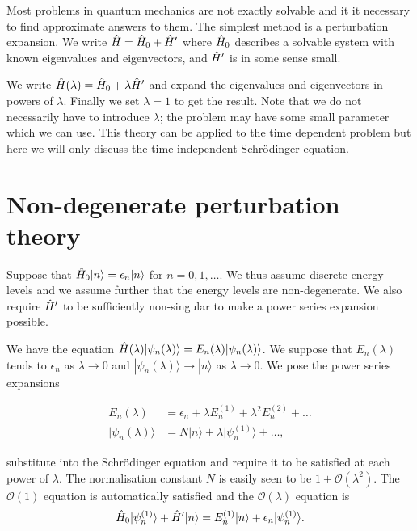 \documentclass{notes}
\newcommand{\cO}{\mathcal{O}}
\newcommand{\ket}[1]{|#1\rangle}
\begin{document}
Most problems in quantum mechanics are not exactly solvable and it
it necessary to find approximate answers to them.  The simplest method is
a perturbation expansion.  We write $\Hat{H} = \Hat{H}_0 + \Hat{H}'$
where $\Hat{H}_0$ describes a solvable system with known eigenvalues and
eigenvectors, and $\Hat{H}'$ is in some sense small.

We write $\Hat{H}(\lambda) = \Hat{H}_0 + \lambda \Hat{H}'$ and
expand the eigenvalues and eigenvectors in powers of $\lambda$.  Finally
we set $\lambda = 1$ to get the result.  Note that we do not necessarily
have to introduce $\lambda$; the problem may have some small parameter
which we can use. This theory can be applied to the time dependent problem
but here we will only discuss the time independent Schr\"odinger equation.

\section{Non-degenerate perturbation theory}

Suppose that $\Hat{H}_0 \ket{n} = \epsilon_n \ket{n}$ for $n=0,1, \dots$.
We thus assume discrete energy levels and we assume further that the
energy levels are non-degenerate.  We also require $\Hat{H}'$ to
be sufficiently non-singular to make a power series expansion possible.

We have the equation $\Hat{H}(\lambda) \ket{\psi_n(\lambda)} =
E_n(\lambda) \ket{\psi_n(\lambda)}$.  We suppose that $E_n(\lambda)$
tends to $\epsilon_n$ as $\lambda \to 0$ and $\ket{\psi_n(\lambda)}
\to \ket{n}$ as $\lambda \to 0$.  We pose the power series expansions

\begin{align*}
E_n(\lambda) &= \epsilon_n + \lambda E^{(1)}_n + \lambda^2 E^{(2)}_n + \dots \\
\ket{\psi_n(\lambda)} &= N \ket{n} + \lambda \ket{\psi_n^{(1)}} + \dots,
\end{align*} 

substitute into the Schr\"odinger equation and require it to be satisfied
at each power of $\lambda$.  The normalisation constant $N$ is
easily seen to be $1 + \cO(\lambda^2)$. The $\cO(1)$ equation is automatically
satisfied and the $\cO(\lambda)$ equation is
\[
\Hat{H}_0\ket{\psi_n^{(1)}} + \Hat{H}' \ket{n}
= E_n^{(1)} \ket{n} + \epsilon_n \ket{\psi_n^{(1)}}.
\]
\end{document}
